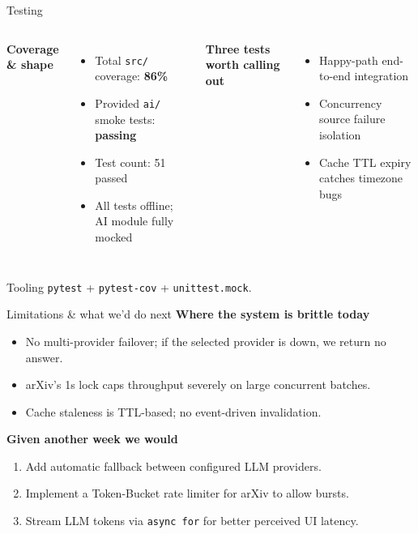 \documentclass[aspectratio=169,11pt]{beamer}
\begin{document}
\begin{frame}{Testing}
  \begin{columns}[T,onlytextwidth]
  \textbf{Coverage \& shape}
  \begin{itemize}\setlength\itemsep{0.3em}
    \item Total \texttt{src/} coverage: \textbf{86\%}
    \item Provided \texttt{ai/} smoke tests: \textcolor{ok}{\textbf{passing}}
    \item Test count: 51 passed
    \item All tests offline; AI module fully mocked
  \end{itemize}

  \textbf{Three tests worth calling out}
  \begin{itemize}\setlength\itemsep{0.3em}
    \item Happy-path end-to-end integration
    \item Concurrency source failure isolation
    \item Cache TTL expiry catches timezone bugs
  \end{itemize}
  \end{columns}

  \vspace{0.6em}
  \begin{block}{Tooling}
    \texttt{pytest} + \texttt{pytest-cov} + \texttt{unittest.mock}.
  \end{block}
\end{frame}

\begin{frame}{Limitations \& what we'd do next}
  \textbf{Where the system is brittle today}
  \begin{itemize}\setlength\itemsep{0.3em}
    \item No multi-provider failover; if the selected provider is down, we return no answer.
    \item arXiv's 1s lock caps throughput severely on large concurrent batches.
    \item Cache staleness is TTL-based; no event-driven invalidation.
  \end{itemize}

  \vspace{0.4em}
  \textbf{Given another week we would}
  \begin{enumerate}\setlength\itemsep{0.3em}
    \item Add automatic fallback between configured LLM providers.
    \item Implement a Token-Bucket rate limiter for arXiv to allow bursts.
    \item Stream LLM tokens via \texttt{async for} for better perceived UI latency.
  \end{enumerate}
\end{frame}
\end{document}

